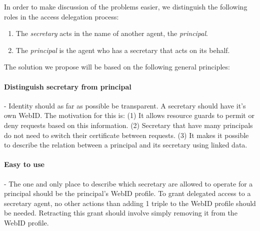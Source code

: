 \documentclass[a4paper]{llncs}
\begin{document}




In order to make discussion of the problems easier, we distinguish the following roles in the access delegation process:
\begin{enumerate}
    \item The \textit{secretary} acts in the name of another agent, the \textit{principal}.
    \item The \textit{principal} is the agent who has a secretary that acts on its behalf.
\end{enumerate}
The solution we propose will be based on the following general principles:

\paragraph{Distinguish secretary from principal }-
Identity should as far as possible be transparent.
A secretary should have it's own WebID.
The motivation for this is:
(1) It allows resource guards to permit or deny requests based on this information.
(2) Secretary that have many principals do not need to switch their certificate between requests.
(3) It makes it possible to describe the relation between a principal and its secretary using linked data.

\paragraph{Easy to use}-
The one and only place to describe which secretary are allowed to operate for a principal should be the principal's WebID profile.
To grant delegated access to a secretary agent, no other actions than adding 1 triple to the WebID profile should be needed.
Retracting this grant should involve simply removing it from the WebID profile.
\end{document}
